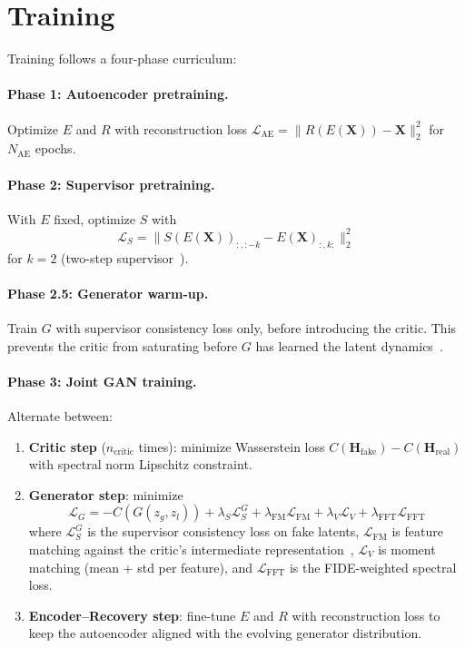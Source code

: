 \documentclass[10pt,twocolumn]{article}
\begin{document}
\section{Training}
\label{sec:training}

Training follows a four-phase curriculum:

\paragraph{Phase 1: Autoencoder pretraining.}
Optimize $E$ and $R$ with reconstruction loss
$\mathcal{L}_{\text{AE}} = \|R(E(\mathbf{X})) - \mathbf{X}\|_2^2$
for $N_{\text{AE}}$ epochs.

\paragraph{Phase 2: Supervisor pretraining.}
With $E$ fixed, optimize $S$ with
\[
  \mathcal{L}_S = \|S(E(\mathbf{X}))_{:,:-k} - E(\mathbf{X})_{:,k:}\|_2^2
\]
for $k = 2$ (two-step supervisor~\cite{seriesgan2024}).

\paragraph{Phase 2.5: Generator warm-up.}
Train $G$ with supervisor consistency loss only, before introducing the
critic.  This prevents the critic from saturating before $G$ has
learned the latent dynamics~\cite{yoon2019timegan}.

\paragraph{Phase 3: Joint GAN training.}
Alternate between:

\begin{enumerate}
  \item \textbf{Critic step} ($n_{\text{critic}}$ times): minimize
    Wasserstein loss $C(\mathbf{H}_{\text{fake}}) - C(\mathbf{H}_{\text{real}})$
    with spectral norm Lipschitz constraint.

  \item \textbf{Generator step}: minimize
    \[
      \mathcal{L}_G = -C(G(z_g,z_l))
      + \lambda_S \mathcal{L}_S^G
      + \lambda_{\text{FM}} \mathcal{L}_{\text{FM}}
      + \lambda_V \mathcal{L}_V
      + \lambda_{\text{FFT}} \mathcal{L}_{\text{FFT}}
    \]
    where $\mathcal{L}_S^G$ is the supervisor consistency loss on fake
    latents, $\mathcal{L}_{\text{FM}}$ is feature matching against the
    critic's intermediate representation~\cite{salimans2016improved},
    $\mathcal{L}_V$ is moment matching (mean + std per feature), and
    $\mathcal{L}_{\text{FFT}}$ is the FIDE-weighted spectral loss.

  \item \textbf{Encoder--Recovery step}: fine-tune $E$ and $R$ with
    reconstruction loss to keep the autoencoder aligned with the
    evolving generator distribution.
\end{enumerate}
\end{document}
